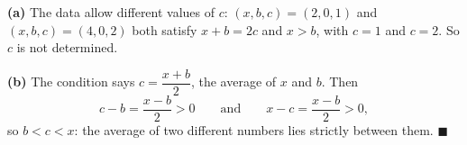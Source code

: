 \textbf{(a)} The data allow different values of $c$: $(x,b,c)=(2,0,1)$ and $(x,b,c)=(4,0,2)$ both satisfy $x+b=2c$ and $x>b$, with $c=1$ and $c=2$. So $c$ is not determined.

\textbf{(b)} The condition says $c=\dfrac{x+b}{2}$, the average of $x$ and $b$. Then
\[
c-b=\dfrac{x-b}{2}>0\qquad\text{and}\qquad x-c=\dfrac{x-b}{2}>0,
\]
so $b<c<x$: the average of two different numbers lies strictly between them. $\blacksquare$
